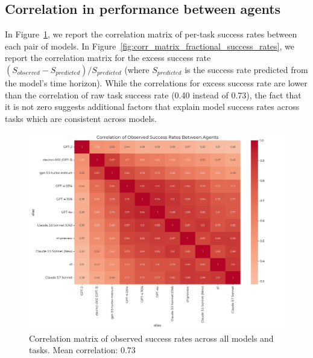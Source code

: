 \documentclass{article}
\begin{document}
\subsection{Correlation in performance between agents}
In Figure~\ref{fig:corr_matrix_observed_success_rates}, we report the correlation matrix of per-task success rates between each pair of models. 
In Figure~\ref{fig:corr_matrix_fractional_success_rates}, we report the correlation matrix for the excess success rate $({S_{observed}-S_{predicted}})/{S_{predicted}}$ (where $S_{predicted}$ is the success rate predicted from the model's time horizon). While the correlations for excess success rate are lower than the correlation of raw task success rate (0.40 instead of 0.73), the fact that it is not zero suggests additional factors that explain model success rates across tasks which are consistent across models. 

\begin{figure}
    \centering
    \includegraphics[width=0.8\linewidth]{plots/success_correlations/observed_success_rates_correlations.png}
    \caption{Correlation matrix of observed success rates across all models and tasks. Mean correlation: 0.73}
    \label{fig:corr_matrix_observed_success_rates}
\end{figure}
\end{document}
